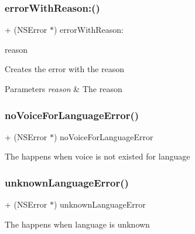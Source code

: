 \subsubsection{\texorpdfstring{error\+With\+Reason\+:()}{errorWithReason:()}}
{\footnotesize\ttfamily + (N\+S\+Error $\ast$) error\+With\+Reason\+: \begin{DoxyParamCaption}\item[{(N\+S\+String $\ast$)}]{reason }\end{DoxyParamCaption}}

Creates the error with the reason 
\begin{DoxyParams}{Parameters}
{\em reason} & The reason \\
\hline
\end{DoxyParams}
\hypertarget{interface_s_t_c_error_adfc5cd1630b5547138c2857180444f7b}{}\label{interface_s_t_c_error_adfc5cd1630b5547138c2857180444f7b} 
\subsubsection{\texorpdfstring{no\+Voice\+For\+Language\+Error()}{noVoiceForLanguageError()}}
{\footnotesize\ttfamily + (N\+S\+Error $\ast$) no\+Voice\+For\+Language\+Error \begin{DoxyParamCaption}{ }\end{DoxyParamCaption}}

The happens when voice is not existed for language \hypertarget{interface_s_t_c_error_ab408794baad577ad3a98048cf4b81b79}{}\label{interface_s_t_c_error_ab408794baad577ad3a98048cf4b81b79} 
\subsubsection{\texorpdfstring{unknown\+Language\+Error()}{unknownLanguageError()}}
{\footnotesize\ttfamily + (N\+S\+Error $\ast$) unknown\+Language\+Error \begin{DoxyParamCaption}{ }\end{DoxyParamCaption}}

The happens when language is unknown \hypertarget{interface_s_t_c_error_acab90d57e4c1b5e866164d0b6fbcfa14}{}\label{interface_s_t_c_error_acab90d57e4c1b5e866164d0b6fbcfa14} 

